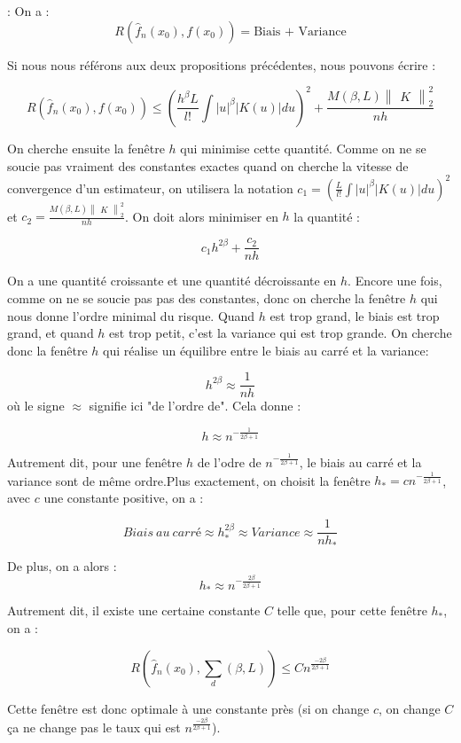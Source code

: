 \documentclass[
]{book}
\begin{document}
\begin{demo}: 
  On a :
$$
 R(\hat {f}_n(x_0),f(x_0))= \text{Biais + Variance}
$$ 

   Si nous nous référons aux deux propositions précédentes, nous pouvons écrire :

$$
 R(\hat {f}_n(x_0),f(x_0))\leqslant(\frac{h^{\beta}L}{l!}\int |u|^{\beta}|K(u)|du)^2 + \frac{M(\beta,L)\begin{Vmatrix}K\end{Vmatrix}_2^2}{nh}
$$

On cherche ensuite la fenêtre $h$ qui minimise cette quantité. Comme on ne se soucie pas vraiment des constantes exactes quand on cherche la vitesse de convergence d'un estimateur, on utilisera la notation $c_1=(\frac{L}{l!}\int |u|^{\beta}|K(u)|du)^2$ et $c_2=\frac{M(\beta,L)\begin{Vmatrix}K\end{Vmatrix}_2^2}{nh}$. On doit alors minimiser en $h$ la quantité :


$$
  c_1h^{2\beta}+\frac{c_2}{nh}
$$

On a une quantité croissante et une quantité décroissante en $h$. Encore une fois, comme on ne se soucie pas pas des constantes, donc on cherche la fenêtre $h$ qui nous donne l'ordre minimal du risque. Quand $h$ est trop grand, le biais est trop grand, et quand $h$ est trop petit, c'est la variance qui est trop grande. On cherche donc la fenêtre $h$ qui réalise un équilibre entre le biais au carré et la variance:

$$ 
  h^{2\beta}\approx\frac{1}{nh}
$$
où le signe $\approx$ signifie ici "de l'ordre de". Cela donne :

$$
  h\approx n^{-\frac{1}{2\beta +1}}
$$

Autrement dit, pour une fenêtre $h$ de l'odre de $n^{-\frac{1}{2\beta+1}}$, le biais au carré et la variance sont de même ordre.Plus exactement, on choisit la fenêtre $h_*=cn^{-\frac{1}{2\beta+1}}$, avec $c$ une constante positive, on a :

$$
  Biais\ au\ carré \approx h_{*}^{2\beta}\approx Variance\approx \frac{1}{nh_{*}}
$$

De plus, on a alors :
$$
  h_* \approx n^{-\frac{2\beta}{2\beta + 1}}
$$

 
Autrement dit, il existe une certaine constante $C$ telle que, pour cette fenêtre $h_*$, on a :

$$
  R(\hat {f}_n(x_0),\sum_d(\beta,L))\leqslant Cn^{\frac{-2\beta}{2\beta + 1}}
$$

  Cette fenêtre est donc optimale à une constante près (si on change $c$, on change $C$ ça ne change pas le taux qui est $n^{\frac{-2\beta}{2\beta+1}}$).\newline
\end{demo}
\end{document}
